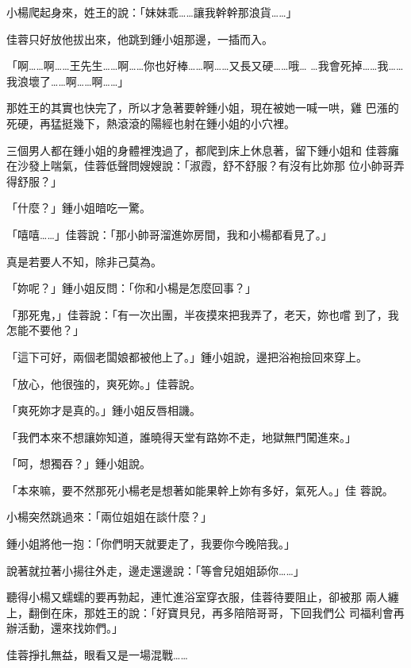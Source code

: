 小楊爬起身來，姓王的說：「妹妹乖……讓我幹幹那浪貨……」

佳蓉只好放他拔出來，他跳到鍾小姐那邊，一插而入。

「啊……啊……王先生……啊……你也好棒……啊……又長又硬……哦…
…我會死掉……我……我浪壞了……啊……啊……」

那姓王的其實也快完了，所以才急著要幹鍾小姐，現在被她一喊一哄，雞
巴漲的死硬，再猛挺幾下，熱滾滾的陽經也射在鍾小姐的小穴裡。

三個男人都在鍾小姐的身體裡洩過了，都爬到床上休息著，留下鍾小姐和
佳蓉癱在沙發上喘氣，佳蓉低聲問嫂嫂說：「淑霞，舒不舒服？有沒有比妳那
位小帥哥弄得舒服？」

「什麼？」鍾小姐暗吃一驚。

「嘻嘻……」佳蓉說：「那小帥哥溜進妳房間，我和小楊都看見了。」

真是若要人不知，除非己莫為。

「妳呢？」鍾小姐反問：「你和小楊是怎麼回事？」

「那死鬼，」佳蓉說：「有一次出團，半夜摸來把我弄了，老天，妳也嚐
到了，我怎能不要他？」

「這下可好，兩個老闆娘都被他上了。」鍾小姐說，邊把浴袍撿回來穿上。

「放心，他很強的，爽死妳。」佳蓉說。

「爽死妳才是真的。」鍾小姐反唇相譏。

「我們本來不想讓妳知道，誰曉得天堂有路妳不走，地獄無門闖進來。」

「呵，想獨吞？」鍾小姐說。

「本來嘛，要不然那死小楊老是想著如能果幹上妳有多好，氣死人。」佳
蓉說。

小楊突然跳過來：「兩位姐姐在談什麼？」

鍾小姐將他一抱：「你們明天就要走了，我要你今晚陪我。」

說著就拉著小揚往外走，邊走還邊說：「等會兒姐姐舔你……」

聽得小楊又蠕蠕的要再勃起，連忙進浴室穿衣服，佳蓉待要阻止，卻被那
兩人纏上，翻倒在床，那姓王的說：「好寶貝兒，再多陪陪哥哥，下回我們公
司福利會再辦活動，還來找妳們。」

佳蓉掙扎無益，眼看又是一場混戰……










